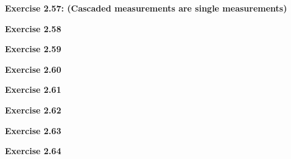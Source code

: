 \documentclass{article}
\begin{document}
\bigskip

\begin{framed}
    \noindent \textbf{Exercise 2.57: (Cascaded measurements are single measurements)}
    
    \medskip
    
    
\end{framed}

\bigskip

\begin{framed}
    \noindent \textbf{Exercise 2.58}
    
    \medskip
    
    
\end{framed}

\bigskip

\begin{framed}
    \noindent \textbf{Exercise 2.59}
    
    \medskip
    
    
\end{framed}

\bigskip

\begin{framed}
    \noindent \textbf{Exercise 2.60}
    
    \medskip
    
    
\end{framed}

\bigskip

\begin{framed}
    \noindent \textbf{Exercise 2.61}
    
    \medskip
    
    
\end{framed}

\bigskip

\begin{framed}
    \noindent \textbf{Exercise 2.62}
    
    \medskip
    
    
\end{framed}

\bigskip

\begin{framed}
    \noindent \textbf{Exercise 2.63}
    
    \medskip
    
    
\end{framed}

\bigskip

\begin{framed}
    \noindent \textbf{Exercise 2.64}
    
    \medskip
    
    
\end{framed}
\end{document}
